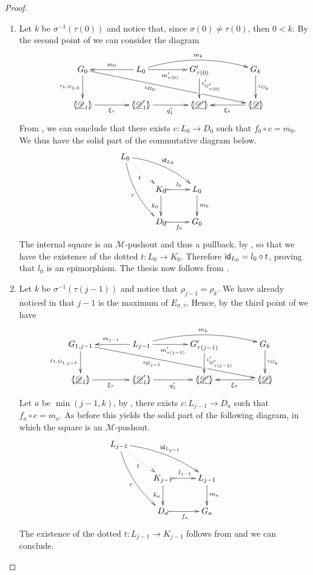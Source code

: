 \begin{proof}
	\begin{enumerate}
		\item Let $k$ be $\sigma^{-1}(\tau(0))$ and notice that, since $\sigma(0)\neq \tau(0)$, then $0< k$.  By  the second point of   we can consider the diagram
		\[\xymatrix@C=40pt{G_{0} \ar[drrr]_(.4){\iota_{G_0}}|(.675)\hole \ar[d]_{\iota_{1,G_{1,0}}}& L_0 \ar[r]_{m'_{\tau(0)}} \ar@/^.4cm/[rr]^{m_{k}} \ar[l]_{m_{0}} &G'_{\tau(0)} \ar[d]^(.45){\iota'_{G'_{\tau(0)}}} & G_{k} \ar[d]^{\iota_{G_k}}\\ \lpro\der{D}_1 \rpro \ar[r]_{\xi_{\tau}} &\lpro \der{D}'_1\rpro \ar[r]_{q'_1} & \lpro \der{D'}\rpro & \tpro{D} \ar[l]^{\xi_{\sigma}}}\]
		From , we can conclude that there exists $c\colon L_0\to D_0$ such that $f_0\circ c=m_0$. We thus have the solid part of the commutative diagram below.
		\[\xymatrix{L_0 \ar@/^.3cm/[drr]^{\id{L_0}} \ar@{.>}[dr]_{t} \ar@/_.3cm/[ddr]_{c}\\ & K_0 \ar[d]_{k_0}\ar@{>->}[r]^{l_0}& L_0 \ar[d]^{m_0} \\& D_0 \ar@{>->}[r]_{f_0} & G_0} \]
		The internal square is an $\mathcal{M}$-pushout and thus a pullback, by , so that we have the existence of the dotted $t\colon L_0\to K_0$. Therefore $\mathsf{id}_{L_0}=l_0\circ t$, proving that $l_0$ is an epimorphism. The thesis now follows from . 
		\item  Let $k$ be $\sigma^{-1}(\tau(j-1))$ and notice that $\rho_{j-1}=\rho_k$. We have already noticed in  that $j-1$ is the maximum of $E_{\sigma, \tau}$.  Hence, by the third point of  we have
		\[\xymatrix@C=40pt{G_{1,{j-1}} \ar[drrr]_(.4){\iota_{G_{j-1}}}|(.675)\hole \ar[d]_{\iota_{1,G_{1,j-1}}}& L_{j-1} \ar[r]_{m'_{\tau({j-1})}} \ar@/^.4cm/[rr]^{m_{k}} \ar[l]_{m_{{j-1}}} &G'_{\tau({j-1})} \ar[d]^{\iota'_{G'_{\tau({j-1})}}} & G_{k} \ar[d]^{\iota_{G_k}}\\ \lpro\der{D}_1 \rpro \ar[r]_{\xi_{\tau}} &\lpro \der{D}'_1\rpro \ar[r]_{q'_1} & \lpro \der{D'}\rpro & \tpro{D} \ar[l]^{\xi_{\sigma}}}\]
		Let $a$ be $\min(j-1, k)$, by ,  there exists $c\colon L_{j-1}\to D_a$ such that $f_a\circ c=m_a$. As before this yields the solid part of the following diagram, in which the square is an $\mathcal{M}$-pushout.
		\[\xymatrix{L_{j-1} \ar@/^.3cm/[drr]^{\id{L_{j-1}}} \ar@{.>}[dr]_{t} \ar@/_.3cm/[ddr]_{c}\\ & K_{j-1} \ar[d]_{k_a}\ar@{>->}[r]^{l_{j-1}}& L_{j-1} \ar[d]^{m_a} \\& D_a \ar@{>->}[r]_{f_a} & G_a} \]
		The existence of the dotted $t\colon L_{j-1}\to K_{j-1}$ follows from   and we can conclude. \qedhere
	\end{enumerate}
\end{proof}


